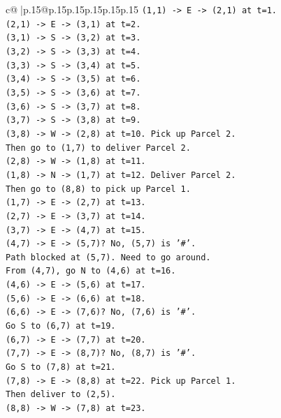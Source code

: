 \documentclass{article}
\begin{document}
{\begin{supertabular}{c@{$\;$}|p{.15\linewidth}@{}p{.15\linewidth}p{.15\linewidth}p{.15\linewidth}p{.15\linewidth}p{.15\linewidth}}
{{{\texttt{(1,1) {-}> E {-}> (2,1) at t=1.} \\
\texttt{(2,1) {-}> E {-}> (3,1) at t=2.} \\
\texttt{(3,1) {-}> S {-}> (3,2) at t=3.} \\
\texttt{(3,2) {-}> S {-}> (3,3) at t=4.} \\
\texttt{(3,3) {-}> S {-}> (3,4) at t=5.} \\
\texttt{(3,4) {-}> S {-}> (3,5) at t=6.} \\
\texttt{(3,5) {-}> S {-}> (3,6) at t=7.} \\
\texttt{(3,6) {-}> S {-}> (3,7) at t=8.} \\
\texttt{(3,7) {-}> S {-}> (3,8) at t=9.} \\
\texttt{(3,8) {-}> W {-}> (2,8) at t=10. Pick up Parcel 2.} \\
\texttt{Then go to (1,7) to deliver Parcel 2.} \\
\texttt{(2,8) {-}> W {-}> (1,8) at t=11.} \\
\texttt{(1,8) {-}> N {-}> (1,7) at t=12. Deliver Parcel 2.} \\
\texttt{Then go to (8,8) to pick up Parcel 1.} \\
\texttt{(1,7) {-}> E {-}> (2,7) at t=13.} \\
\texttt{(2,7) {-}> E {-}> (3,7) at t=14.} \\
\texttt{(3,7) {-}> E {-}> (4,7) at t=15.} \\
\texttt{(4,7) {-}> E {-}> (5,7)? No, (5,7) is '\#'.} \\
\texttt{Path blocked at (5,7). Need to go around.} \\
\texttt{From (4,7), go N to (4,6) at t=16.} \\
\texttt{(4,6) {-}> E {-}> (5,6) at t=17.} \\
\texttt{(5,6) {-}> E {-}> (6,6) at t=18.} \\
\texttt{(6,6) {-}> E {-}> (7,6)? No, (7,6) is '\#'.} \\
\texttt{Go S to (6,7) at t=19.} \\
\texttt{(6,7) {-}> E {-}> (7,7) at t=20.} \\
\texttt{(7,7) {-}> E {-}> (8,7)? No, (8,7) is '\#'.} \\
\texttt{Go S to (7,8) at t=21.} \\
\texttt{(7,8) {-}> E {-}> (8,8) at t=22. Pick up Parcel 1.} \\
\texttt{Then deliver to (2,5).} \\
\texttt{(8,8) {-}> W {-}> (7,8) at t=23.} \\
}}}
\end{supertabular}}
\end{document}
